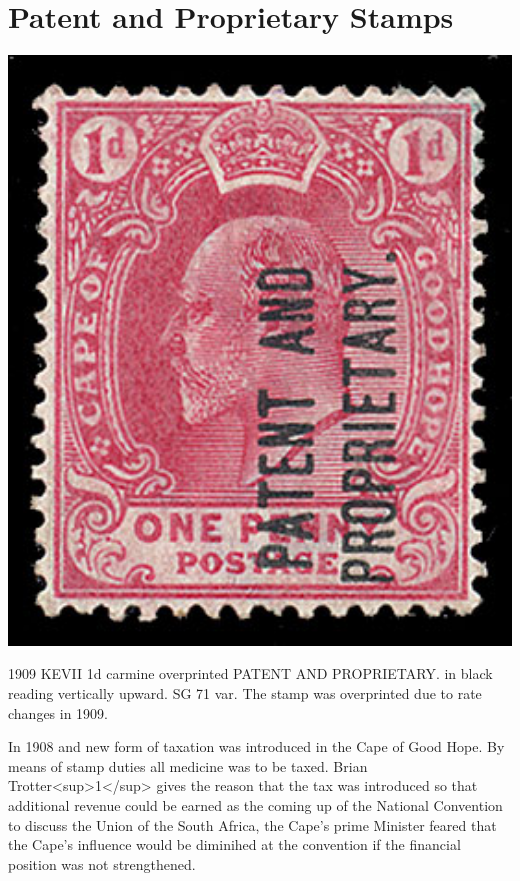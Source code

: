 \chapter{Patent and Proprietary Stamps} 

\begin{marginfigure}
\includegraphics[width=1.0\textwidth]{../cape-of-good-hope/revenue-patent.jpg}

\caption{1909 KEVII 1d carmine overprinted PATENT AND PROPRIETARY. in black reading vertically upward. SG 71 var. The stamp was overprinted due to rate changes in 1909.}

\end{marginfigure}
In 1908 and new form of taxation was introduced in the Cape of Good Hope. By means of stamp duties all medicine was to be taxed. Brian Trotter<sup>1</sup> gives the reason that the tax was introduced so that additional revenue could be earned as the coming up of the National Convention to discuss the Union of the South Africa, the Cape's prime Minister feared that the Cape's influence would be diminihed at the convention if the financial position was not strengthened.


